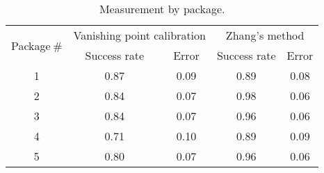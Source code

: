 \begin{table}[H]
\centering
\begin{tabular}{@{} *5c @{}}
\toprule
\multirow{2}{*}{Package$~\#$} & \multicolumn{2}{c}{Vanishing point calibration} & \multicolumn{2}{c}{Zhang's method}\\ 
\cmidrule(r){2-3}
\cmidrule(r){4-5}
& Success rate & Error & Success rate & Error \\
\midrule
 1 & 0.87 & 0.09 & 0.89 & 0.08 \\ 
 2 & 0.84 & 0.07 & 0.98 & 0.06 \\
 3 & 0.84 & 0.07 & 0.96 & 0.06 \\
 4 & 0.71 & 0.10 & 0.89 & 0.09 \\
 5 & 0.80 & 0.07 & 0.96 & 0.06 \\
\bottomrule 
 \end{tabular}
 \caption{Measurement by package.}
\label{table:key_measurement_by_package}
\end{table}

